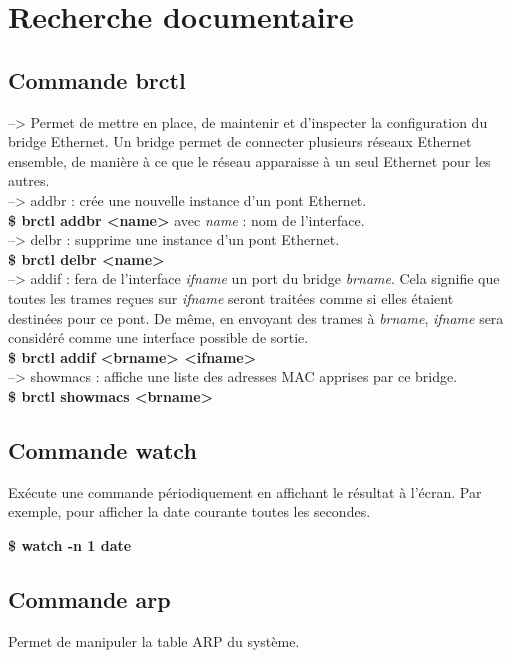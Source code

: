 \documentclass[a4paper]{article}
\begin{document}
	\section{Recherche documentaire}
		\subsection{Commande brctl}
\noindent
--> Permet de mettre en place, de maintenir et d'inspecter la configuration du bridge Ethernet. Un bridge permet de connecter plusieurs réseaux Ethernet ensemble, de manière à ce que le réseau apparaisse à un seul Ethernet pour les autres. \\

\noindent
--> addbr : crée une nouvelle instance d'un pont Ethernet.\\
\textbf{\$ brctl addbr <name>} avec \textit{name} : nom de l'interface. \\

\noindent
--> delbr : supprime une instance d'un pont Ethernet. \\
\textbf{\$ brctl delbr <name>} \\

\noindent
--> addif : fera de l'interface \textit{ifname} un port du bridge \textit{brname}. Cela signifie que toutes les trames reçues sur \textit{ifname} seront traitées comme si elles étaient destinées pour ce pont. De même, en envoyant des trames à \textit{brname}, \textit{ifname} sera considéré comme une interface possible de sortie. \\
\textbf{\$ brctl addif <brname> <ifname>} \\

\noindent
--> showmacs : affiche une liste des adresses MAC apprises par ce bridge. \\
\textbf{\$ brctl showmacs <brname>}

	\subsection{Commande watch}
Exécute une commande périodiquement en affichant le résultat à l'écran. Par exemple, pour afficher la date courante toutes les secondes. 

\textbf{\$ watch -n 1 date}

	\subsection{Commande arp}
\noindent
Permet de manipuler la table ARP du système. \\
\end{document}

